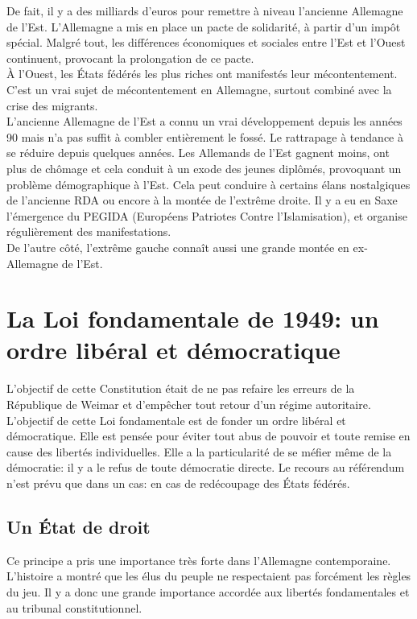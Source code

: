 \documentclass[10pt, a4paper, openany]{book}
\begin{document}
De fait, il y a des milliards d'euros pour remettre à niveau l'ancienne Allemagne de l'Est. L'Allemagne a mis en place un pacte de solidarité, à partir d'un impôt spécial. Malgré tout, les différences économiques et sociales entre l'Est et l'Ouest continuent, provocant la prolongation de ce pacte. \\
À l'Ouest, les États fédérés les plus riches ont manifestés leur mécontentement. C'est un vrai sujet de mécontentement en Allemagne, surtout combiné avec la crise des migrants. \\
L'ancienne Allemagne de l'Est a connu un vrai développement depuis les années 90 mais n'a pas suffit à combler entièrement le fossé. Le rattrapage à tendance à se réduire depuis quelques années. Les Allemands de l'Est gagnent moins, ont plus de chômage et cela conduit à un exode des jeunes diplômés, provoquant un problème démographique à l'Est. Cela peut conduire à certains élans nostalgiques de l'ancienne RDA ou encore à la montée de l'extrême droite. Il y a eu en Saxe l'émergence du PEGIDA (Européens Patriotes Contre l'Islamisation), et organise régulièrement des manifestations. \\
De l'autre côté, l'extrême gauche connaît aussi une grande montée en ex-Allemagne de l'Est. 


\section{La Loi fondamentale de 1949: un ordre libéral et démocratique}

L'objectif de cette Constitution était de ne pas refaire les erreurs de la République de Weimar et d'empêcher tout retour d'un régime autoritaire. L'objectif de cette Loi fondamentale est de fonder un ordre libéral et démocratique. Elle est pensée pour éviter tout abus de pouvoir et toute remise en cause des libertés individuelles. Elle a la particularité de se méfier même de la démocratie: il y a le refus de toute démocratie directe. Le recours au référendum n'est prévu que dans un cas: en cas de redécoupage des États fédérés.

\subsection{Un État de droit}

Ce principe a pris une importance très forte dans l'Allemagne contemporaine. L'histoire a montré que les élus du peuple ne respectaient pas forcément les règles du jeu. Il y a donc une grande importance accordée aux libertés fondamentales et au tribunal constitutionnel.
\end{document}
